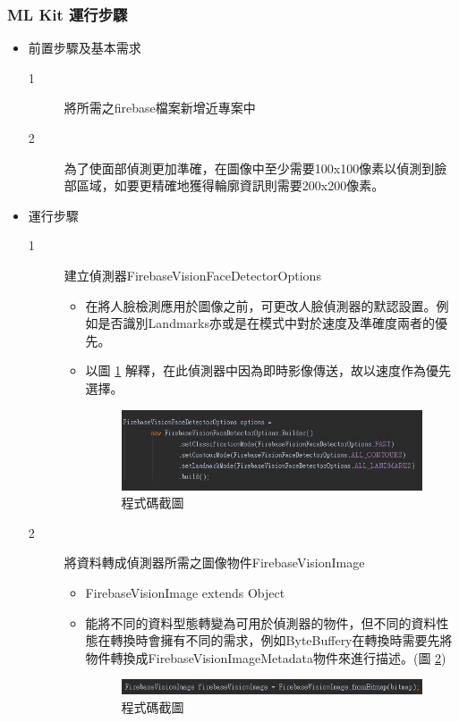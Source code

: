 \documentclass[12pt]{article}  %
\theoremstyle{plain}
\begin{document}
\subsubsection{ML Kit 運行步驟}
\begin{itemize}
\item 前置步驟及基本需求
\begin{description}
\item[1] 將所需之firebase檔案新增近專案中
\item[2] 為了使面部偵測更加準確，在圖像中至少需要100x100像素以偵測到臉部區域，如要更精確地獲得輪廓資訊則需要200x200像素。
\end{description}

\item 運行步驟
\begin{description}
\item[1] 建立偵測器FirebaseVisionFaceDetectorOptions
\begin{itemize}
\item 在將人臉檢測應用於圖像之前，可更改人臉偵測器的默認設置。例如是否識別Landmarks亦或是在模式中對於速度及準確度兩者的優先。
\item 以圖 \ref{DetectorOptions} 解釋，在此偵測器中因為即時影像傳送，故以速度作為優先選擇。
\begin{figure}[htbp]
\centering
\includegraphics[width=13cm]{pic/ch3/DetectorOptions.JPG}
\caption{程式碼截圖} \label{DetectorOptions}
\end{figure}
\end{itemize}

\item[2] 將資料轉成偵測器所需之圖像物件FirebaseVisionImage
\begin{itemize}
\item FirebaseVisionImage extends Object
\item 能將不同的資料型態轉變為可用於偵測器的物件，但不同的資料性態在轉換時會擁有不同的需求，例如ByteBuffery在轉換時需要先將物件轉換成FirebaseVisionImageMetadata物件來進行描述。(圖 \ref{VisionImage})
\begin{figure}[htbp]
\centering
\includegraphics[width=15cm]{pic/ch3/VisionImage.JPG}
\caption{程式碼截圖} \label{VisionImage}
\end{figure}
\end{itemize}


\end{description}
\end{itemize}
\end{document}

